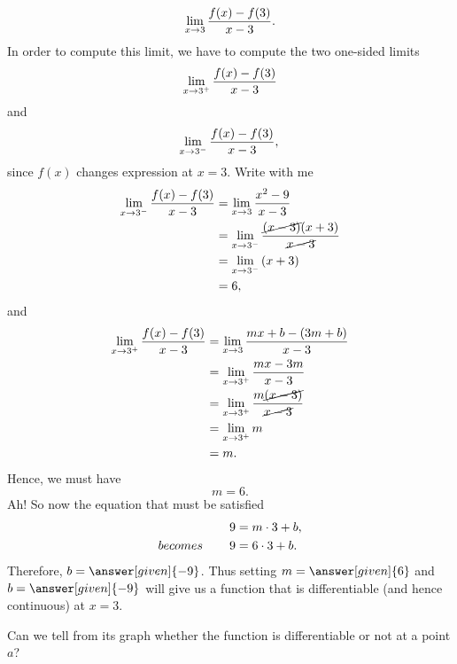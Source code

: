 \documentclass{ximera}
\begin{document}
\begin{example}
\begin{explanation}
 \[
 \lim_{x\to 3}\frac{f(x)-f(3)}{x-3}.\\
\]
In order to compute this limit, we have to compute the two one-sided limits
 \[
 \lim_{x\to 3^{+}}\frac{f(x)-f(3)}{x-3}\\
\]
and
\[
 \lim_{x\to 3^{-}}\frac{f(x)-f(3)}{x-3},\\
\]
since  $f(x)$ changes expression at $x=3$.
Write with me
     \begin{align*}
        \lim_{x\to 3^{-}}\frac{f(x)-f(3)}{x-3}&= \lim_{x\to 3}\frac{x^2 -9}{x-3}\\
      &= \lim_{x\to 3^{-}}\frac{\cancel{(x-3)}(x+3)}{\cancel{x-3}}\\
      &= \lim_{x\to 3^{-}}\left(x+3\right)\\
      &=6,
    \end{align*}
    and
   \begin{align*}
        \lim_{x\to 3^{+}}\frac{f(x)-f(3)}{x-3}&= \lim_{x\to 3}\frac{mx+b -(3m+b)}{x-3}\\
          &= \lim_{x\to 3^{+}}\frac{mx-3m}{x-3}\\
      &= \lim_{x\to 3^{+}}\frac{m\cancel{(x-3)}}{\cancel{x-3}}\\
      &= \lim_{x\to 3^{+}}m\\
      &=m.
    \end{align*}
    Hence, we must have
   \[
      m=6.
  \]
    Ah! So now the equation that must be satisfied
    \begin{align*}
      9 &= m\cdot 3 + b,\\
    becomes\hspace{0.3in}  9 &= 6\cdot 3 + b.\\
    \end{align*}
   Therefore, $b=\answer[given]{-9}$. Thus setting $m=\answer[given]{6}$ and
    $b=\answer[given]{-9}$ will give us a function that is differentiable (and hence
    continuous) at $x=3$.
   
  \end{explanation}
\end{example}

Can we tell from its graph whether the function is differentiable or not at a point $a$?
\end{document}
